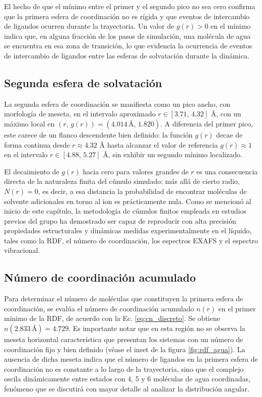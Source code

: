 El hecho de que el mínimo entre el primer y el segundo pico no sea cero confirma que la primera esfera de coordinación no es rígida y que eventos de intercambio de ligandos ocurren durante la trayectoria. Un valor de $g(r) > 0$ en el mínimo indica que, en alguna fracción de los pasos de simulación, una molécula de agua se encuentra en esa zona de transición, lo que evidencia la ocurrencia de eventos de intercambio de ligandos entre las esferas de solvatación durante la dinámica.

\subsection*{Segunda esfera de solvatación}

La segunda esfera de coordinación se manifiesta como un pico ancho, con morfología de meseta, en el intervalo aproximado $r \in [3.71,\, 4.32]$ Å, con un máximo local en $(r,\, g(r)) = (4.014\, Å,\, 1.820)$. A diferencia del primer pico, este carece de un flanco descendente bien definido: la función $g(r)$ decae de forma continua desde $r \approx 4.32$ Å hasta alcanzar el valor de referencia $g(r) \approx 1$ en el intervalo $r \in [4.88,\, 5.27]$ Å, sin exhibir un segundo mínimo localizado.

El decaimiento de $g(r)$ hacia cero para valores grandes de $r$ es una consecuencia directa de la naturaleza finita del cúmulo simulado: más allá de cierto radio, $N(r) = 0$, es decir, a esa distancia la probabilidad de encontrar moléculas de solvente adicionales en torno al ion es prácticamente nula. Como se mencionó al inicio de este capítulo, la metodología de cúmulos finitos empleada en estudios previos del grupo ha demostrado ser capaz de reproducir con 
alta precisión propiedades estructurales y dinámicas medidas experimentalmente en el líquido, tales como la RDF, el número de coordinación, los espectros EXAFS y el espectro vibracional.

\subsection*{Número de coordinación acumulado}

Para determinar el número de moléculas que constituyen la primera esfera de coordinación, se evalúa el número de coordinación acumulado $n(r)$ en el primer mínimo de la RDF, de acuerdo con la Ec. \ref{eq:cn_discreto}. Se obtiene $n(2.833\,\text{Å}) = 4.729$. Es importante notar que en esta región no se observa la meseta horizontal característica que
presentan los sistemas con un número de coordinación fijo y bien definido (véase el inset de la figura \ref{fig:rdf_agua}). La ausencia de dicha meseta indica que el número de ligandos en la primera esfera de coordinación no es constante a lo largo de la trayectoria, sino que el complejo oscila dinámicamente entre estados con 4, 5 y 6 moléculas de agua coordinadas, fenómeno que se discutirá con mayor detalle al analizar la distribución angular.


